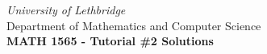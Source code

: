 \documentclass[12pt]{article}
\newcommand{\skipline}{\vspace{12pt}}
\begin{document}
\author{Instructor: Sean Fitzpatrick}
\thispagestyle{empty}
\begin{center}
\emph{University of Lethbridge}\\
Department of Mathematics and Computer Science\\
{\bf MATH 1565 - Tutorial \#2 Solutions}\\
\end{center}
\end{document}
